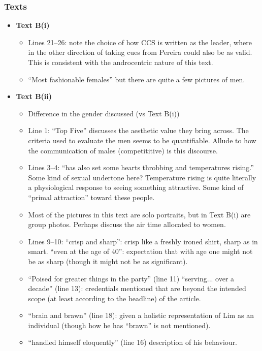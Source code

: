 \documentclass[../main.tex]{subfiles}
\begin{document}
			\subsubsection*{Texts}
				\begin{itemize}
					\item \textbf{Text B(i)} \begin{itemize}
						\item Lines 21--26: note the choice of how CCS is written as the leader, where in the other direction of taking cues from Pereira could also be as valid. This is consistent with the androcentric nature of this text.
						\item ``Most fashionable females'' but there are quite a few pictures of men.
					\end{itemize}
				\item \textbf{Text B(ii)} \begin{itemize}
						\item Difference in the gender discussed (vs Text B(i))
						\item Line 1: ``Top Five'' discusses the aesthetic value they bring across. The criteria used to evaluate the men seems to be quantifiable. Allude to how the communication of males (competititive) is this discourse.
						\item Lines 3--4: ``has also set some hearts throbbing and temperatures rising.'' Some kind of sexual undertone here? Temperature rising is quite literally a physiological response to seeing something attractive. Some kind of ``primal attraction'' toward these people.
						\item Most of the pictures in this text are solo portraits, but in Text B(i) are group photos. Perhaps discuss the air time allocated to women.
						\item Lines 9--10: ``crisp and sharp'': crisp like a freshly ironed shirt, sharp as in smart. ``even at the age of 40'': expectation that with age one might not be as sharp (though it might not be as significant).
						\item ``Poised for greater things in the party'' (line 11) ``serving... over a decade'' (line 13): credentials mentioned that are beyond the intended scope (at least according to the headline) of the article.
						\item ``brain and brawn'' (line 18): given a holistic representation of Lim as an individual (though how he has ``brawn'' is not mentioned).
						\item ``handled himself eloquently'' (line 16) description of his behaviour. 

\end{itemize}
\end{itemize}
\end{document}
